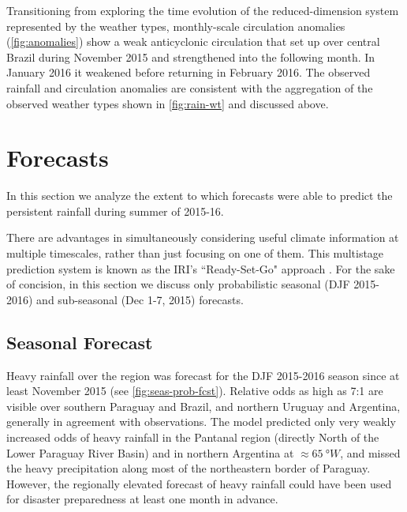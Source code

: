 \documentclass{ametsoc}
\begin{document}
Transitioning from exploring the time evolution of the reduced-dimension system represented by the weather types, monthly-scale circulation anomalies (\cref{fig:anomalies}) show a weak anticyclonic circulation that set up over central Brazil during November 2015 and strengthened into the following month.
In January 2016 it weakened before returning in February 2016.
The observed rainfall and circulation anomalies are consistent with the aggregation of the observed weather types shown in \cref{fig:rain-wt} and discussed above.


\section{Forecasts} \label{sec:fcsts}

In this section we analyze the extent to which forecasts were able to predict the persistent rainfall during summer of 2015-16.

There are advantages in simultaneously considering useful climate information at multiple timescales, rather than just focusing on one of them.
This multistage prediction system is known as the IRI's ``Ready-Set-Go" approach \citep{Hellmuth:2011vt,Goddard:2014kf}.
For the sake of concision, in this section we discuss only probabilistic seasonal (DJF 2015-2016) and sub-seasonal (Dec 1-7, 2015) forecasts.

\subsection{Seasonal Forecast}

Heavy rainfall over the region was forecast for the DJF 2015-2016 season since at least November 2015 (see \cref{fig:seas-prob-fcst}).
Relative odds as high as 7:1 are visible over southern Paraguay and Brazil, and northern Uruguay and Argentina, generally in agreement with observations.
The model predicted only very weakly increased odds of heavy rainfall in the Pantanal region (directly North of the Lower Paraguay River Basin) and in northern Argentina at $\approx \SI{65}{\degree W}$, and missed the heavy precipitation along most of the northeastern border of Paraguay.
However, the regionally elevated forecast of heavy rainfall could have been used for disaster preparedness at least one month in advance.
\end{document}
